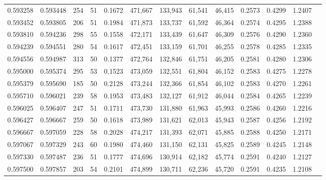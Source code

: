 \begin{tabular}{rrrrrrrrrrrrr}
0.593258 & 0.593448 &    254 &    51 &                                     0.1672 & 471,667 & 133,943 &  61,541 &  46,415 & 0.2573 & 0.4299 & 1.2407 \\
0.593452 & 0.593805 &    206 &    51 &                                     0.1984 & 471,873 & 133,737 &  61,592 &  46,364 & 0.2574 & 0.4295 & 1.2388 \\
0.593810 & 0.594236 &    298 &    55 &                                     0.1558 & 472,171 & 133,439 &  61,647 &  46,309 & 0.2576 & 0.4290 & 1.2360 \\
0.594239 & 0.594551 &    280 &    54 &                                     0.1617 & 472,451 & 133,159 &  61,701 &  46,255 & 0.2578 & 0.4285 & 1.2335 \\
0.594556 & 0.594987 &    313 &    50 &                                     0.1377 & 472,764 & 132,846 &  61,751 &  46,205 & 0.2581 & 0.4280 & 1.2306 \\
0.595000 & 0.595374 &    295 &    53 &                                     0.1523 & 473,059 & 132,551 &  61,804 &  46,152 & 0.2583 & 0.4275 & 1.2278 \\
0.595379 & 0.595690 &    185 &    50 &                                     0.2128 & 473,244 & 132,366 &  61,854 &  46,102 & 0.2583 & 0.4270 & 1.2261 \\
0.595710 & 0.596021 &    239 &    58 &                                     0.1953 & 473,483 & 132,127 &  61,912 &  46,044 & 0.2584 & 0.4265 & 1.2239 \\
0.596025 & 0.596407 &    247 &    51 &                                     0.1711 & 473,730 & 131,880 &  61,963 &  45,993 & 0.2586 & 0.4260 & 1.2216 \\
0.596427 & 0.596667 &    259 &    50 &                                     0.1618 & 473,989 & 131,621 &  62,013 &  45,943 & 0.2587 & 0.4256 & 1.2192 \\
0.596667 & 0.597059 &    228 &    58 &                                     0.2028 & 474,217 & 131,393 &  62,071 &  45,885 & 0.2588 & 0.4250 & 1.2171 \\
0.597067 & 0.597329 &    243 &    60 &                                     0.1980 & 474,460 & 131,150 &  62,131 &  45,825 & 0.2589 & 0.4245 & 1.2148 \\
0.597330 & 0.597487 &    236 &    51 &                                     0.1777 & 474,696 & 130,914 &  62,182 &  45,774 & 0.2591 & 0.4240 & 1.2127 \\
0.597500 & 0.597857 &    203 &    54 &                                     0.2101 & 474,899 & 130,711 &  62,236 &  45,720 & 0.2591 & 0.4235 & 1.2108 \\

\end{tabular}
